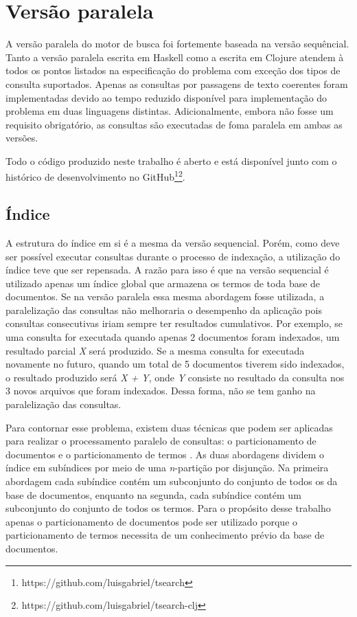 \section{Versão paralela}

A versão paralela do motor de busca foi fortemente baseada na versão sequêncial. Tanto a versão paralela escrita em Haskell como a escrita em Clojure atendem à todos os pontos listados na especificação do problema com exceção dos tipos de consulta suportados. Apenas as consultas por passagens de texto coerentes foram implementadas devido ao tempo reduzido disponível para implementação do problema em duas linguagens distintas. Adicionalmente, embora não fosse um requisito obrigatório, as consultas são executadas de foma paralela em ambas as versões.

Todo o código produzido neste trabalho é aberto e está disponível junto com o histórico de desenvolvimento no GitHub\footnote{https://github.com/luisgabriel/tsearch}\footnote{https://github.com/luisgabriel/tsearch-clj}.

\subsection{Índice}

A estrutura do índice em si é a mesma da versão sequencial. Porém, como deve ser possível executar consultas durante o processo de indexação, a utilização do índice teve que ser repensada. A razão para isso é que na versão sequencial é utilizado apenas um índice global que armazena os termos de toda base de documentos. Se na versão paralela essa mesma abordagem fosse utilizada, a paralelização das consultas não melhoraria o desempenho da aplicação pois consultas consecutivas iriam sempre ter resultados cumulativos. Por exemplo, se uma consulta for executada quando apenas 2 documentos foram indexados, um resultado parcial \emph{X} será produzido. Se a mesma consulta for executada novamente no futuro, quando um total de 5 documentos tiverem sido indexados, o resultado produzido será \emph{X + Y}, onde \emph{Y} consiste no resultado da consulta nos 3 novos arquivos que foram indexados. Dessa forma, não se tem ganho na paralelização das consultas.

Para contornar esse problema, existem duas técnicas que podem ser aplicadas para realizar o processamento paralelo de consultas: o particionamento de documentos e o particionamento de termos \cite{buttcher2010information}. As duas abordagens dividem o índice em subíndices por meio de uma \emph{n}-partição por disjunção. Na primeira abordagem cada subíndice contém um subconjunto do conjunto de todos os da base de documentos, enquanto na segunda, cada subíndice contém um subconjunto do conjunto de todos os termos. Para o propósito desse trabalho apenas o particionamento de documentos pode ser utilizado porque o particionamento de termos necessita de um conhecimento prévio da base de documentos.

